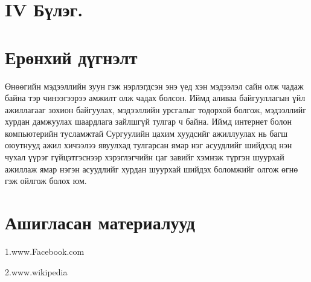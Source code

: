 \documentclass[12pt]{article}
\begin{document}
\section     {IV Бүлэг.} 
    
\section     {Ерөнхий дүгнэлт}  


    Өнөөгийн мэдээллийн зуун гэж нэрлэгдсэн энэ үед хэн мэдээлэл сайн олж чадаж байна тэр чинээгээрээ амжилт олж чадах болсон. Иймд аливаа байгууллагын үйл ажиллагааг зохион байгуулах, мэдээллийн урсгалыг тодорхой болгож, мэдээллийг хурдан дамжуулах шаардлага зайлшгүй тулгар ч байна. Иймд интернет болон компьютерийн тусламжтай Сургуулийн цахим хуудсийг ажиллуулах нь багш оюутнууд ажил хичээлээ явуулхад тулгарсан ямар нэг асуудлийг шийдхэд нэн чухал үүрэг гүйцэтгэснээр хэрэглэгчийн цаг завийг хэмнэж түргэн шуурхай ажиллаж ямар нэгэн асуудлийг хурдан шуурхай шийдэх боломжийг олгож өгнө гэж ойлгож болох юм.
      



               
\section     {Ашигласан материалууд}   

               
             1.www.Facebook.com   
                         
             2.www.wikipedia               
                              
               
\end{document}

